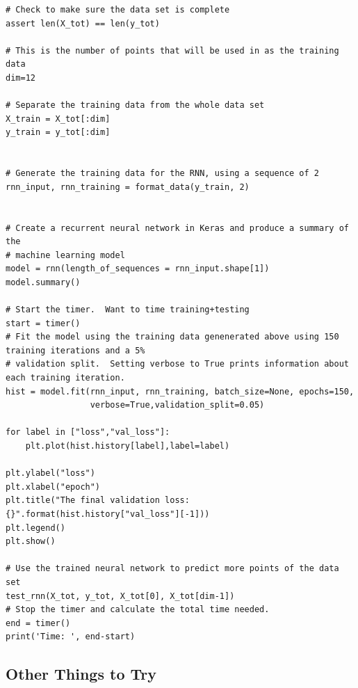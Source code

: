 \documentclass[%
oneside,                 %
final,                   %
10pt]{article}
\begin{document}
\begin{verbatim}
# Check to make sure the data set is complete
assert len(X_tot) == len(y_tot)

# This is the number of points that will be used in as the training data
dim=12

# Separate the training data from the whole data set
X_train = X_tot[:dim]
y_train = y_tot[:dim]


# Generate the training data for the RNN, using a sequence of 2
rnn_input, rnn_training = format_data(y_train, 2)


# Create a recurrent neural network in Keras and produce a summary of the 
# machine learning model
model = rnn(length_of_sequences = rnn_input.shape[1])
model.summary()

# Start the timer.  Want to time training+testing
start = timer()
# Fit the model using the training data genenerated above using 150 training iterations and a 5%
# validation split.  Setting verbose to True prints information about each training iteration.
hist = model.fit(rnn_input, rnn_training, batch_size=None, epochs=150, 
                 verbose=True,validation_split=0.05)

for label in ["loss","val_loss"]:
    plt.plot(hist.history[label],label=label)

plt.ylabel("loss")
plt.xlabel("epoch")
plt.title("The final validation loss: {}".format(hist.history["val_loss"][-1]))
plt.legend()
plt.show()

# Use the trained neural network to predict more points of the data set
test_rnn(X_tot, y_tot, X_tot[0], X_tot[dim-1])
# Stop the timer and calculate the total time needed.
end = timer()
print('Time: ', end-start)

\end{verbatim}


\subsection*{Other Things to Try}
\end{document}
